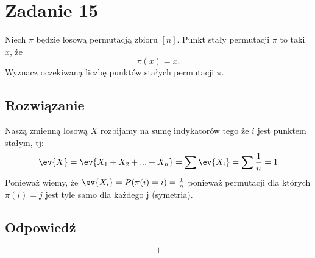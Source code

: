 \section{Zadanie 15}
Niech \(\pi\) będzie losową permutacją zbioru \([n]\). Punkt stały permutacji \(\pi\) to taki \(x\), że
\[\pi(x) = x.\]
Wyznacz oczekiwaną liczbę punktów stałych permutacji \(\pi\).

\subsection*{Rozwiązanie}
Naszą zmienną losową \(X\) rozbijamy na sumę indykatorów tego że \(i\) jest punktem stałym, tj:
\[\ev{X} = \ev{X_1+X_2+...+X_n} = \sum \ev{X_i} = \sum \frac{1}{n} = 1\]
Ponieważ wiemy, że \(\ev{X_i} = P(\pi(i)=i) = \frac{1}{n}\) ponieważ permutacji dla których \(\pi(i)=j\) jest tyle samo dla każdego j (symetria).


\subsection*{Odpowiedź}
\[
	\boxed{\text{1}}
\]
